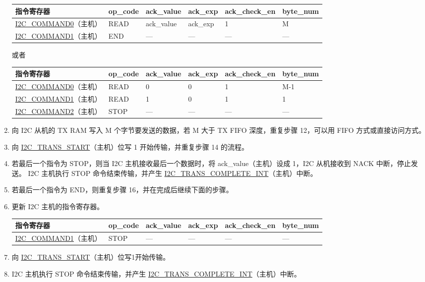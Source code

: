 \documentclass[main\_\_CN.tex]{subfiles}
\begin{document}
\begin{enumerate}
\begin{longtable}{ | p{4cm} | p{2cm} | p{2cm} | p{2cm} |p{2.2cm} | p{1.8cm} |}
\hline\rowcolor{lightgray}
指令寄存器& op\_code & ack\_value&ack\_exp&ack\_check\_en&byte\_num  \\ \hline
\hyperref[fielddesc:I2CCOMMAND0]{I2C\_COMMAND0}（主机）& READ& ack\_value&ack\_exp&1&M  \\ \hline
\hyperref[fielddesc:I2CCOMMAND1]{I2C\_COMMAND1}（主机）& END& ---&---&---&---  \\ \hline
\end{longtable} 

或者

\begin{longtable}{ | p{4cm} | p{2cm} | p{2cm} | p{2cm} |p{2.2cm} | p{1.8cm} |}
\hline\rowcolor{lightgray}
指令寄存器& op\_code & ack\_value&ack\_exp&ack\_check\_en&byte\_num  \\ \hline
\hyperref[fielddesc:I2CCOMMAND0]{I2C\_COMMAND0}（主机）& READ& 0&0&1&M-1  \\ \hline
\hyperref[fielddesc:I2CCOMMAND1]{I2C\_COMMAND1}（主机）& READ& 1&0&1&1  \\ \hline
\hyperref[fielddesc:I2CCOMMAND2]{I2C\_COMMAND2}（主机）& STOP& ---&---&---&---  \\ \hline
\end{longtable} 

\item 向 I2C 从机的 TX RAM 写入 M 个字节要发送的数据，若 M 大于 TX FIFO 深度，重复步骤 12，可以用 FIFO 方式或直接访问方式。
\item 向 \hyperref[fielddesc:I2CTRANSSTART]{I2C\_TRANS\_START}（主机）位写 1 开始传输，并重复步骤 14 的流程。
\item 若最后一个指令为 STOP，则当 I2C 主机接收最后一个数据时，将 ack\_value（主机）设成 1，I2C 从机接收到 NACK 中断，停止发送。 I2C 主机执行 STOP 命令结束传输，并产生 \hyperref[int:i2c-trans-complete]{I2C\_TRANS\_COMPLETE\_INT}（主机）中断。
\item 若最后一个指令为 END，则重复步骤 16，并在完成后继续下面的步骤。
\item 更新 I2C 主机的指令寄存器。
\begin{longtable}{ | p{4cm} | p{2cm} | p{2cm} | p{2cm} |p{2.2cm} | p{1.8cm} |}
\hline\rowcolor{lightgray}
指令寄存器& op\_code & ack\_value&ack\_exp&ack\_check\_en&byte\_num  \\ \hline
\hyperref[fielddesc:I2CCOMMAND1]{I2C\_COMMAND1}（主机）& STOP& ---&---&---&---  \\ \hline
\end{longtable} 
\item 向 \hyperref[fielddesc:I2CTRANSSTART]{I2C\_TRANS\_START}（主机）位写1开始传输。
\item I2C 主机执行 STOP 命令结束传输，并产生 \hyperref[int:i2c-trans-complete]{I2C\_TRANS\_COMPLETE\_INT}（主机）中断。

\end{enumerate}
\end{document}

